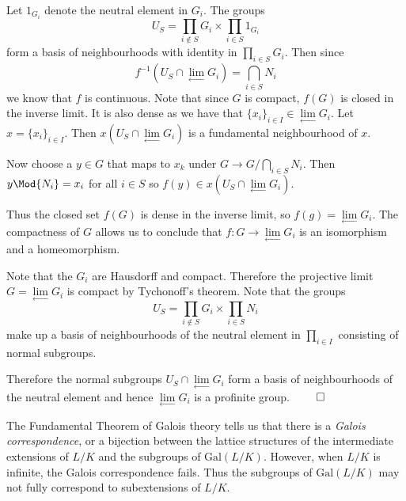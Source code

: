 \documentclass[a4paper, 12pt,oneside,openany]{book}
\begin{document}
Let $1_{G_i}$ denote the neutral element in $G_i$. The groups $$U_S=\prod\limits_{i \not\in S} G_i \times \prod\limits_{i \in S} 1_{G_i}$$ form a basis of neighbourhoods with identity in $\prod\limits_{i \in S} G_i$. Then since $$f^{-1}(U_S \cap \lim\limits_\leftarrow G_i) = \bigcap\limits_{i \in S} N_i$$ we know that $f$ is continuous. Note that since $G$ is compact, $f(G)$ is closed in the inverse limit. It is also dense as we have that $\{x_i\}_{i \in I} \in \lim\limits_\leftarrow G_i$. Let $x=\{x_i\}_{i \in I} $. Then $x(U_S \cap \lim\limits_\leftarrow G_i)$ is a fundamental neighbourhood of $x$.

Now choose a $y \in G$ that maps to $x_k$ under $G \to G/\bigcap\limits_{i\in S} N_i$. Then $y \Mod{N_i} = x_i$ for all $i \in S$ so $f(y) \in x(U_S \cap \lim\limits_\leftarrow G_i)$. 

Thus the closed set $f(G)$ is dense in the inverse limit, so $f(g) = \lim\limits_\leftarrow G_i$. The compactness of $G$ allows us to conclude that $f: G\to \lim\limits_\leftarrow G_i$ is an isomorphism and a homeomorphism.

Note that the $G_i$ are Hausdorff and compact. Therefore the projective limit $G = \lim\limits_\leftarrow G_i$ is compact by Tychonoff's theorem. Note that the groups $$U_S = \prod\limits_{i \not\in S} G_i \times \prod\limits_{i \in S} N_i$$ make up a basis of neighbourhoods of the neutral element in $\prod\limits_{i \in I}$ consisting of normal subgroups. 

Therefore the normal subgroups $U_S \cap \lim\limits_\leftarrow G_i$ form a basis of neighbourhoods of the neutral element and hence $\lim\limits_\leftarrow G_i$ is a profinite group. $\qed$



The Fundamental Theorem of Galois theory tells us that there is a \emph{Galois correspondence}, or a bijection between the lattice structures of the intermediate extensions of $L/K$ and the subgroups of $\text{Gal}(L/K)$. However, when $L/K$ is infinite, the Galois correspondence fails. Thus the subgroups of $\text{Gal}(L/K)$ may not fully correspond to subextensions of $L/K$. 
\end{document}
